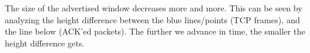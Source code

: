 The size of the advertised window decreases more and more. This can be seen by analyzing the height difference between the blue lines/points (TCP frames), and the line below (ACK'ed packets). The further we advance in time, the smaller the height difference gets.
